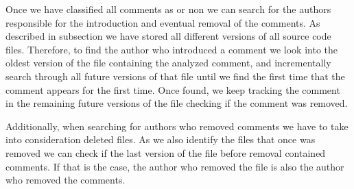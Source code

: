 Once we have classified all comments as \SATD or non \SATD we can search for the authors responsible for the introduction and eventual removal of the \SATD comments. As described in subsection  we have stored all different versions of all source code files. Therefore, to find the author who introduced a \SATD comment we look into the oldest version of the file containing the analyzed comment, and incrementally search through all future versions of that file until we find the first time that the comment appears for the first time. Once found, we keep tracking the \SATD comment in the remaining future versions of the file checking if  the \SATD comment was removed. 

Additionally, when searching for authors who removed \SATD comments we have to take into consideration deleted files. As we also identify the files that once was removed we can check if the last version of the file before removal contained \SATD comments. If that is the case, the author who removed the file is also the author who removed the \SATD comments. 